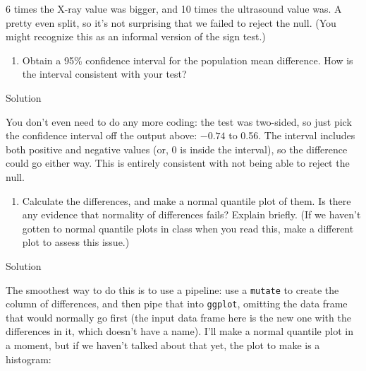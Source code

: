 \documentclass[]{tufte-book}
\newenvironment{Shaded}{}{}
\newcommand{\DataTypeTok}[1]{\textcolor[rgb]{0.56,0.13,0.00}{#1}}
\newcommand{\DecValTok}[1]{\textcolor[rgb]{0.25,0.63,0.44}{#1}}
\newcommand{\KeywordTok}[1]{\textcolor[rgb]{0.00,0.44,0.13}{\textbf{#1}}}
\newcommand{\NormalTok}[1]{#1}
\newcommand{\OperatorTok}[1]{\textcolor[rgb]{0.40,0.40,0.40}{#1}}
\newcommand{\StringTok}[1]{\textcolor[rgb]{0.25,0.44,0.63}{#1}}
\providecommand{\tightlist}{%
  \setlength{\itemsep}{0pt}\setlength{\parskip}{0pt}}
\theoremstyle{definition}
\theoremstyle{definition}
\theoremstyle{definition}
\theoremstyle{remark}
\begin{document}
6 times the X-ray value was bigger, and 10 times the ultrasound value
was. A pretty even split, so it's not surprising that we failed to
reject the null. (You might recognize this as an informal version of the
sign test.)

\begin{enumerate}
\def\labelenumi{(\alph{enumi})}
\setcounter{enumi}{4}
\tightlist
\item
  Obtain a 95\% confidence interval for the population mean difference.
  How is the interval consistent with your test?
\end{enumerate}

Solution

You don't even need to do any more coding: the test was two-sided, so
just pick the confidence interval off the output above: \(-0.74\) to
0.56. The interval includes both positive and negative values (or, 0 is
inside the interval), so the difference could go either way. This is
entirely consistent with not being able to reject the null.

\begin{enumerate}
\def\labelenumi{(\alph{enumi})}
\setcounter{enumi}{5}
\tightlist
\item
  Calculate the differences, and make a normal quantile plot of them. Is
  there any evidence that normality of differences fails? Explain
  briefly. (If we haven't gotten to normal quantile plots in class when
  you read this, make a different plot to assess this issue.)
\end{enumerate}

Solution

The smoothest
way to do this is to use a pipeline: use a \texttt{mutate} to create the
column of differences, and then pipe that into \texttt{ggplot}, omitting
the data frame that would normally go first (the input data frame here
is the new one with the differences in it, which doesn't have a name).
I'll make a normal quantile plot in a moment, but if we haven't talked
about that yet, the plot to make is a histogram:

\begin{Shaded}
\end{Shaded}
\end{document}
